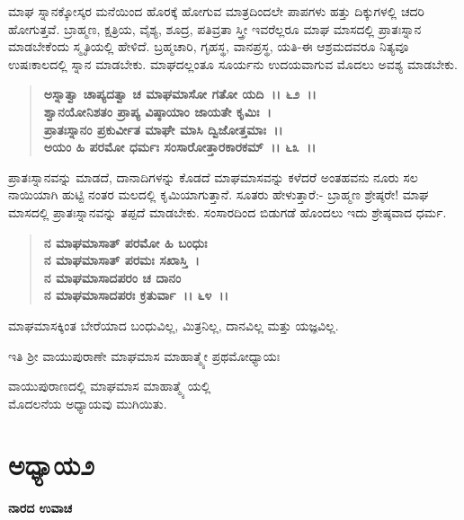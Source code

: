 ಮಾಘ ಸ್ನಾನಕ್ಕೋಸ್ಕರ ಮನೆಯಿಂದ ಹೊರಕ್ಕೆ ಹೋಗುವ ಮಾತ್ರದಿಂದಲೇ ಪಾಪಗಳು ಹತ್ತು ದಿಕ್ಕುಗಳಲ್ಲಿ ಚದರಿ ಹೋಗುತ್ತವೆ. ಬ್ರಾಹ್ಮಣ, ಕ್ಷತ್ರಿಯ, ವೈಶ್ಯ, ಶೂದ್ರ, ಪತಿವ್ರತಾ ಸ್ತ್ರೀ ಇವರೆಲ್ಲರೂ ಮಾಘ ಮಾಸದಲ್ಲಿ ಪ್ರಾತಃಸ್ನಾನ ಮಾಡಬೇಕೆಂದು ಸ್ಮೃತಿಯಲ್ಲಿ ಹೇಳಿದೆ. ಬ್ರಹ್ಮಚಾರಿ, ಗೃಹಸ್ಥ, ವಾನಪ್ರಸ್ಥ, ಯತಿ-ಈ ಆಶ್ರಮದವರೂ ನಿತ್ಯವೂ ಉಷಃಕಾಲದಲ್ಲಿ ಸ್ನಾನ ಮಾಡಬೇಕು. ಮಾಘದಲ್ಲಂತೂ ಸೂರ್ಯನು ಉದಯವಾಗುವ ಮೊದಲು ಅವಶ್ಯ ಮಾಡಬೇಕು.

\begin{verse}
\textbf{ಅಸ್ನಾತ್ವಾ ಚಾಪ್ಯದತ್ವಾ ಚ ಮಾಘಮಾಸೋ ಗತೋ ಯದಿ~।। ೬೨~।।}\\\textbf{ಶ್ವಾನಯೋನಿಶತಂ ಪ್ರಾಪ್ಯ ವಿಷ್ಠಾಯಾಂ ಜಾಯತೇ ಕೃಮಿಃ~।}\\\textbf{ಪ್ರಾತಃಸ್ನಾನಂ ಪ್ರಕುರ್ವೀತ ಮಾಘೇ ಮಾಸಿ ದ್ವಿಜೋತ್ತಮಾಃ~।।} \\\textbf{ಅಯಂ ಹಿ ಪರಮೋ ಧರ್ಮಃ ಸಂಸಾರೋತ್ತಾರಕಾರಕಮ್~।। ೬೩~।।}
\end{verse}

ಪ್ರಾತಃಸ್ನಾನವನ್ನು ಮಾಡದೆ, ದಾನಾದಿಗಳನ್ನು ಕೊಡದೆ ಮಾಘಮಾಸವನ್ನು ಕಳೆದರೆ ಅಂತಹವನು ನೂರು ಸಲ ನಾಯಿಯಾಗಿ ಹುಟ್ಟಿ ನಂತರ ಮಲದಲ್ಲಿ ಕೃಮಿಯಾಗುತ್ತಾನೆ. ಸೂತರು ಹೇಳುತ್ತಾರೆ:- ಬ್ರಾಹ್ಮಣ ಶ್ರೇಷ್ಠರೇ! ಮಾಘ ಮಾಸದಲ್ಲಿ ಪ್ರಾತಃಸ್ನಾನವನ್ನು ತಪ್ಪದೆ ಮಾಡಬೇಕು. ಸಂಸಾರದಿಂದ ಬಿಡುಗಡೆ ಹೊಂದಲು ಇದು ಶ್ರೇಷ್ಠವಾದ ಧರ್ಮ.

\begin{verse}
\textbf{ನ ಮಾಘಮಾಸಾತ್ ಪರಮೋ ಹಿ ಬಂಧುಃ}\\\textbf{ನ ಮಾಘಮಾಸಾತ್ ಪರಮಃ ಸಖಾಸ್ತಿ~।}\\\textbf{ನ ಮಾಘಮಾಸಾದಪರಂ ಚ ದಾನಂ} \\\textbf{ನ ಮಾಘಮಾಸಾದಪರಃ ಕ್ರತುರ್ವಾ~।। ೬೪~।। }
\end{verse}

ಮಾಘಮಾಸಕ್ಕಿಂತ ಬೇರೆಯಾದ ಬಂಧುವಿಲ್ಲ, ಮಿತ್ರನಿಲ್ಲ, ದಾನವಿಲ್ಲ ಮತ್ತು ಯಜ್ಞವಿಲ್ಲ.

\begin{center}
ಇತಿ ಶ‍್ರೀ ವಾಯುಪುರಾಣೇ ಮಾಘಮಾಸ ಮಾಹಾತ್ಮ್ಯೇ ಪ್ರಥಮೋಧ್ಯಾಯಃ
\end{center}

\begin{center}
ವಾಯುಪುರಾಣದಲ್ಲಿ ಮಾಘಮಾಸ ಮಾಹಾತ್ಮ್ಯೆ ಯಲ್ಲಿ \\ ಮೊದಲನೆಯ ಅಧ್ಯಾಯವು ಮುಗಿಯಿತು.
\end{center}

\newpage

\section*{ಅಧ್ಯಾಯ\enginline{-}೨}

\begin{flushleft}
\textbf{ನಾರದ ಉವಾಚ\enginline{-}}
\end{flushleft}

